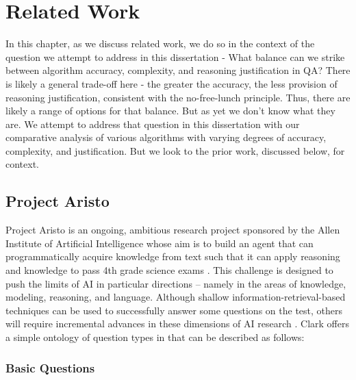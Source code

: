  
\chapter{Related Work}

In this chapter, as we discuss related work, we do so in the context of the question we attempt to address in this dissertation - What balance can we strike between algorithm accuracy, complexity, and reasoning justification in QA?  There is likely a general trade-off here - the greater the accuracy, the less provision of reasoning justification, consistent with the no-free-lunch principle.  Thus, there are likely a range of options for that balance.  But as yet we don't know what they are.  We attempt to address that question in this dissertation with our comparative analysis of various algorithms with varying degrees of accuracy, complexity, and justification.  But we look to the prior work, discussed below, for context.

\section{Project Aristo}

Project Aristo is an ongoing, ambitious research project sponsored by the Allen Institute of Artificial Intelligence whose aim is to build an agent that can programmatically acquire knowledge from text such that it can apply reasoning and knowledge to pass 4th grade science exams \cite{clark2015elementary}.  This challenge is designed to push the limits of AI in particular directions -- namely in the areas of knowledge, modeling, reasoning, and language.  Although shallow information-retrieval-based techniques can be used to successfully answer some questions on the test, others will require incremental advances in these dimensions of AI research \cite{clark2015elementary}.  Clark \cite{clark2015elementary} offers a simple ontology of question types in that can be described as follows:


\subsection{Basic Questions}

